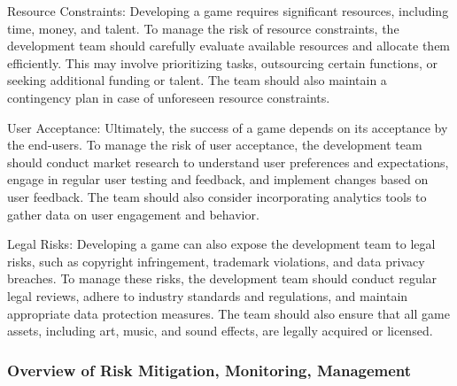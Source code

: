 \documentclass[12pt]{report}
\begin{document}
Resource Constraints: Developing a game requires significant resources, including time, money, and talent. To manage the risk of resource constraints, the development team should carefully evaluate available resources and allocate them efficiently. This may involve prioritizing tasks, outsourcing certain functions, or seeking additional funding or talent. The team should also maintain a contingency plan in case of unforeseen resource constraints.

User Acceptance: Ultimately, the success of a game depends on its acceptance by the end-users. To manage the risk of user acceptance, the development team should conduct market research to understand user preferences and expectations, engage in regular user testing and feedback, and implement changes based on user feedback. The team should also consider incorporating analytics tools to gather data on user engagement and behavior.

Legal Risks: Developing a game can also expose the development team to legal risks, such as copyright infringement, trademark violations, and data privacy breaches. To manage these risks, the development team should conduct regular legal reviews, adhere to industry standards and regulations, and maintain appropriate data protection measures. The team should also ensure that all game assets, including art, music, and sound effects, are legally acquired or licensed.

\subsubsection{Overview of Risk Mitigation, Monitoring, Management}
\justifying
\setlength{\parindent}{4em}
\setlength{\parskip}{0.5em}
\renewcommand{\baselinestretch}{1.5}
\end{document}
